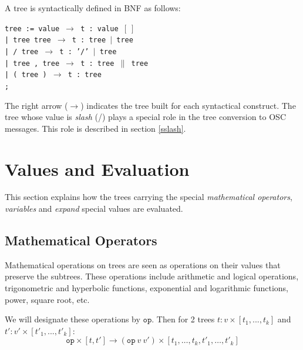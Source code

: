 \documentclass[runningheads]{llncs}
\newcommand{\code}	[2][0.9]	{\vspace{0mm}\begin{center}\colorbox{mygrey}{
							\begin{minipage}[t]{#1\columnwidth} 
							{\small \texttt{#2}}
							\end{minipage}}\end{center}}
\newcommand{\llist}	[1]		{\ensuremath{[#1_1,...,#1_k]}}
\newcommand{\seq}		{\ensuremath{|}}
\newcommand{\paral}		{\ensuremath{\parallel}}
\newcommand{\binop}		{\ensuremath{\texttt{op}}}
\newcommand{\etc}		{\ensuremath{…}}
\newcommand{\emptyf}	{\ensuremath{[\ ]}}
\newcommand{\ula}		{\hspace*{8mm}}
\begin{document}
A tree is syntactically defined in BNF as follows:
\code{tree := value      \hspace*{8mm} $\to$ t : value \emptyf \\
\ula | tree tree         \hspace*{4mm} $\to$ t : tree \seq\ tree \\
\ula | / tree            \hspace*{9.7mm} $\to$ t : '/' \seq\ tree\\
\ula | tree , tree       \hspace*{0mm}  $\to$ t : tree \paral\ tree \\
\ula | ( tree )          \hspace*{6mm} $\to$ t : tree \\
\ula ;
}
The right arrow ($\to$) indicates the tree built for each syntactical construct. 
The tree whose value is \emph{slash} (/) plays a special role in the tree conversion to OSC messages. This role is described in section \ref{sslash}.


\section{Values and Evaluation}\label{sec:valeurs}

This section explains how the trees carrying the special \emph{mathematical operators}, \emph{variables} and \emph{expand} special values are evaluated.

\subsection{Mathematical Operators}

Mathematical operations on trees are seen as operations on their values that preserve the subtrees. These operations include arithmetic and logical operations, trigonometric and hyperbolic functions, exponential and logarithmic functions, power, square root, etc.

We will designate these operations by \binop. Then for 2 trees $t : v \times \llist{t}$ and $t' : v' \times \llist{t'}$:
\[
	\binop \times [ t, t']  \to  (\binop\ v\ v') \times [ t_1,\etc,t_k,t'_1,\etc,t'_k ]
\]

\end{document}

